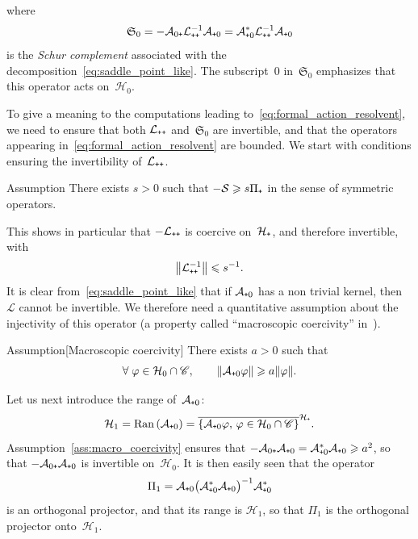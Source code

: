 \documentclass[10pt]{amsart}
\theoremstyle{definition}\newtheorem{defi}[theo]{Definition}\newtheorem{rema}[theo]{Remark}\newtheorem{exam}[theo]{Example}\newtheorem{exem}[theo]{Example}\newtheorem{nota}[theo]{Notation}
\newcommand{\Ran}{\mathrm{Ran}}
\newcommand{\cL}{\mathcal{L}}
\newcommand{\cLs}{\mathcal{S}}
\newcommand{\cLa}{\mathcal{A}}
\newcommand{\cH}{\mathcal{H}}
\newcommand{\scrC}{\mathscr{C}}
\newcommand{\Schur}{\mathfrak{S}_0}
\newcommand{\subplus}{\textnormal{\texttt{+}}}
\renewcommand{\leq}{\leqslant}
\renewcommand{\geq}{\geqslant}
\renewcommand{\ge}{\geqslant}
\let\oldforall\forall
\renewcommand*{\forall}{\mathrel{\oldforall}}
\begin{document}
where
\[
\Schur = -\cLa_{0\subplus} \cL_{\subplus\subplus}^{-1} \cLa_{\subplus0} = \cLa_{\subplus0}^{*} \cL_{\subplus\subplus}^{-1} \cLa_{\subplus0}
\]
is the \emph{Schur complement} associated with the decomposition~\eqref{eq:saddle_point_like}. The subscript~0 in~$\Schur$ emphasizes that this operator acts on~$\cH_0$.

To give a meaning to the computations leading to~\eqref{eq:formal_action_resolvent}, we need to ensure that both $\cL_{\subplus\subplus}$ and~$\Schur$ are invertible, and that the operators appearing in~\eqref{eq:formal_action_resolvent} are bounded. We start with conditions ensuring the invertibility of~$\cL_{\subplus\subplus}$.

\begin{enonce}{Assumption}\label{ass:A_inv}
There exists $s > 0$ such that $-\cLs \ge s \Pi_{\subplus}$ in the sense of symmetric operators.
\end{enonce}

This shows in particular that $-\cL_{\subplus\subplus}$ is coercive on~$\cH_\subplus$, and therefore invertible, with
\[
\left\| \cL_{\subplus\subplus}^{-1} \right\| \leq s^{-1}.
\]
It is clear from~\eqref{eq:saddle_point_like} that if $\cLa_{\subplus0}$ has a non trivial kernel, then $\cL$ cannot be invertible. We therefore need a quantitative assumption about the injectivity of this operator (a property called ``macroscopic coercivity'' in~\cite{DMS15}).

\begin{enonce}{Assumption}[Macroscopic coercivity]\label{ass:macro_coercivity}
There exists $a > 0$ such that
\begin{equation}\label{eq:macro_coercivity_bound}
\forall \varphi \in \cH_{0} \cap \scrC, \qquad \|\cLa_{\subplus0} \varphi\| \geq a \|\varphi\|.
\end{equation}
\end{enonce}

Let us next introduce the range of~$\cLa_{\subplus 0}$:
\[
\cH_{1} = \Ran\left(\cLa_{\subplus 0}\right) = \overline{\left\{\cLa_{\subplus0} \varphi, \, \varphi \in \cH_{0} \cap \scrC \right\}}^{\cH_{\subplus}}.
\]
Assumption~\ref{ass:macro_coercivity} ensures that $-\cLa_{0\subplus} \cLa_{\subplus0} = \cLa_{\subplus0}^{*} \cLa_{\subplus0} \geq a^2$, so that $-\cLa_{0\subplus} \cLa_{\subplus0}$ is invertible on~$\cH_{0}$. It is then easily seen that the operator
\begin{equation}\label{eq:Pi_1}
\Pi_{1} = \cLa_{\subplus0} \big(\cLa_{\subplus0}^*\cLa_{\subplus0}\big)^{-1} \cLa_{\subplus0}^*
\end{equation}
is an orthogonal projector, and that its range is $\cH_{1}$, so that $\Pi_{1}$ is the orthogonal projector onto~$\cH_{1}$.
\end{document}
